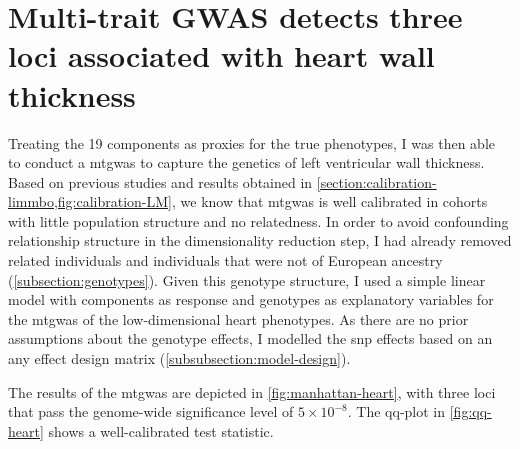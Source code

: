 \section{Multi-trait GWAS detects three loci associated with heart wall thickness}
\label{section:GWAS-3Dheart}
Treating the \num{19} components as proxies for the true phenotypes, I was then able to conduct a \gls{mtgwas} to capture the genetics of left ventricular wall thickness. Based on previous studies \citep{Price2006,Patterson2006} and results obtained in \cref{section:calibration-limmbo,fig:calibration-LM}, we know that \gls{mtgwas} is well calibrated in cohorts with little population structure and no relatedness. In order to avoid confounding relationship structure in the dimensionality reduction step, I had already removed related individuals and individuals that were not of European ancestry (\cref{subsection:genotypes}). Given this genotype structure, I used a simple linear model with components as response and genotypes as explanatory variables for the \gls{mtgwas} of the low-dimensional heart phenotypes. As there are no prior assumptions about the genotype effects, I modelled the \gls{snp} effects based on an any effect design matrix (\cref{subsubsection:model-design}). 

The results of the \gls{mtgwas} are depicted in \cref{fig:manhattan-heart}, with three loci that pass the genome-wide significance level of \(5 \times 10^{-8}\). The qq-plot in \cref{fig:qq-heart} shows a well-calibrated test statistic.

